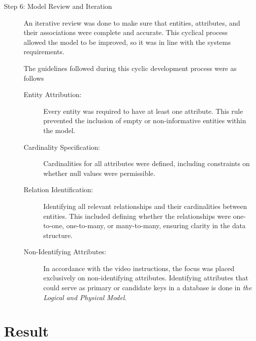 \documentclass[a4paper]{scrartcl}
\begin{document}
\begin{description}
\item[Step 6: Model Review and Iteration]
  An iterative review was done to make sure that entities, attributes, and their
  associations were complete and accurate. This cyclical process allowed the
  model to be improved, so it was in line with the systems requirements.
  
  The guidelines followed during this cyclic development process were as follows
  \begin{description}
    \item[Entity Attribution:]
    Every entity was required to have at least one attribute. This rule
    prevented the inclusion of empty or non-informative entities within the
    model.

    \item[Cardinality Specification:]
    Cardinalities for all attributes were defined, including constraints on
    whether null values were permissible. 

    \item[Relation Identification:]
    Identifying all relevant relationships and their cardinalities between
    entities. This included defining whether the relationships were one-to-one,
    one-to-many, or many-to-many, ensuring clarity in the data structure.

    \item[Non-Identifying Attributes:]
    In accordance with the video instructions, the focus was placed exclusively
    on non-identifying attributes. Identifying attributes that could serve as
    primary or candidate keys in a database is done in
    \emph{the Logical and Physical Model}.
  \end{description}
\end{description}

\pagebreak
\section{Result}


\end{document}
